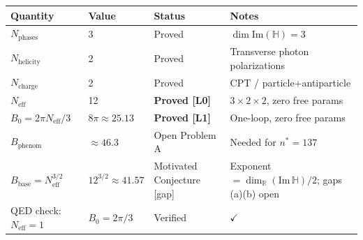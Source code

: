 \documentclass[12pt,a4paper]{article}
\theoremstyle{definition}
\theoremstyle{remark}
\renewcommand{\H}{\mathbb{H}}
\newcommand{\Neff}{N_{\mathrm{eff}}}
\begin{document}
\begin{center}
\begin{tabular}{lllp{4cm}}
  \toprule
  \textbf{Quantity} & \textbf{Value} & \textbf{Status} & \textbf{Notes} \\
  \midrule
  $N_\mathrm{phases}$ & 3 & \textcolor{provengreen}{Proved} & $\dim\mathrm{Im}(\H)=3$ \\
  $N_\mathrm{helicity}$ & 2 & \textcolor{provengreen}{Proved} & Transverse photon polarizations \\
  $N_\mathrm{charge}$ & 2 & \textcolor{provengreen}{Proved} & CPT / particle+antiparticle \\
  $\Neff$ & 12 & \textcolor{provengreen}{\textbf{Proved [L0]}} & $3 \times 2 \times 2$, zero free params \\
  $B_0 = 2\pi\Neff/3$ & $8\pi \approx 25.13$ & \textcolor{provengreen}{\textbf{Proved [L1]}} & One-loop, zero free params \\
  $B_\mathrm{phenom}$ & $\approx 46.3$ & \textcolor{openred}{Open Problem A} & Needed for $n^*=137$ \\
  $B_\mathrm{base} = \Neff^{3/2}$ & $12^{3/2} \approx 41.57$ & \textcolor{openred}{Motivated Conjecture [gap]} & Exponent $= \dim_\mathbb{R}(\mathrm{Im}\,\mathbb{H})/2$; gaps (a)(b) open \\
  \midrule
  QED check: $\Neff=1$ & $B_0 = 2\pi/3$ & \textcolor{provengreen}{Verified} & $\checkmark$ \\
  \bottomrule
\end{tabular}
\end{center}
\end{document}
